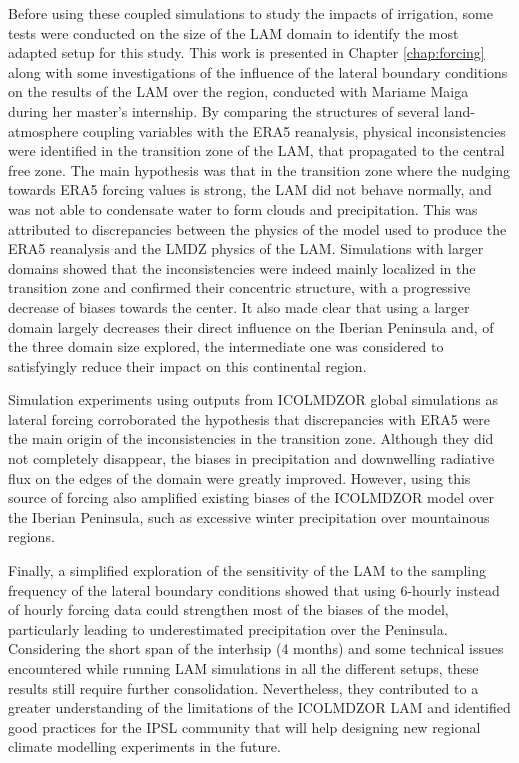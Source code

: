 Before using these coupled simulations to study the impacts of irrigation, some tests were conducted on the size of the LAM domain to identify the most adapted setup for this study. 
This work is presented in Chapter \ref{chap:forcing} along with some investigations of the influence of the lateral boundary conditions on the results of the LAM over the region, conducted with Mariame Maiga during her master's internship. 
By comparing the structures of several land-atmosphere coupling variables with the ERA5 reanalysis, physical inconsistencies were identified in the transition zone of the LAM, that propagated to the central free zone.
The main hypothesis was that in the transition zone where the nudging towards ERA5 forcing values is strong, the LAM did not behave normally, and was not able to condensate water to form clouds and precipitation. This was attributed to discrepancies between the physics of the model used to produce the ERA5 reanalysis and the LMDZ physics of the LAM.  
Simulations with larger domains showed that the inconsistencies were indeed mainly localized in the transition zone and confirmed their concentric structure, with a progressive decrease of biases towards the center. It also made clear that using a larger domain largely decreases their direct influence on the Iberian Peninsula and, of the three domain size explored, the intermediate one was considered to satisfyingly reduce their impact on this continental region.

Simulation experiments using outputs from ICOLMDZOR global simulations as lateral forcing corroborated the hypothesis that discrepancies with ERA5 were the main origin of the inconsistencies in the transition zone. Although they did not completely disappear, the biases in precipitation and downwelling radiative flux on the edges of the domain were greatly improved. However, using this source of forcing also amplified existing biases of the ICOLMDZOR model over the Iberian Peninsula, such as excessive winter precipitation over mountainous regions.

Finally, a simplified exploration of the sensitivity of the LAM to the sampling frequency of the lateral boundary conditions showed that using 6-hourly instead of hourly forcing data could strengthen most of the biases of the model, particularly leading to underestimated precipitation over the Peninsula.
Considering the short span of the interhsip (4 months) and some technical issues encountered while running LAM simulations in all the different setups, these results still require further consolidation. Nevertheless, they contributed to a greater understanding of the limitations of the ICOLMDZOR LAM and identified good practices for the IPSL community that will help designing new regional climate modelling experiments in the future.

